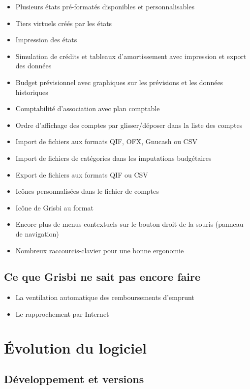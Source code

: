 \begin{itemize}
	\item Plusieurs états pré-formatés disponibles et personnalisables
	\item Tiers virtuels créés par les états
	\item Impression des états
	\item Simulation de crédits et tableaux d'amortissement avec impression et export des données
	\item Budget prévisionnel avec graphiques sur les prévisions et les données historiques
	\item Comptabilité d'association avec plan comptable
	\item Ordre d'affichage des comptes par glisser/déposer dans la liste des comptes
	\item Import de fichiers aux formats \gls{QIF}, \gls{OFX}, \gls{Gnucash} ou \gls{CSV}
	\item Import de fichiers de catégories dans les imputations budgétaires
	\item Export de fichiers aux formats \gls{QIF} ou \gls{CSV}
	\item Icônes personnalisées dans le fichier de comptes
	\item Icône de Grisbi au format 
	\item Encore plus de menus contextuels sur le bouton droit de la souris (panneau de navigation)
	\item Nombreux raccourcis-clavier pour une bonne ergonomie
\end{itemize}


\subsection{Ce que Grisbi ne sait pas encore faire}

\begin{itemize}
	\item La ventilation automatique des remboursements d'emprunt
	\item Le rapprochement par Internet
\end{itemize}


\section{Évolution du logiciel}


\subsection{Développement et versions}

